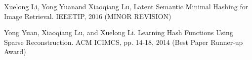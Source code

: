 

\begin{cventries}
\vspace{-0.8em}
  \cventry
    {} %
    {} %
    {} %
    {} %
    {
      \begin{cvitems} %
        \item {Xuelong Li, Yong Yuanand Xiaoqiang Lu, Latent Semantic Minimal Hashing for Image Retrieval. IEEETIP, 2016 (MINOR REVISION)}
        \item {Yong Yuan, Xiaoqiang Lu, and Xuelong Li. Learning Hash Functions Using Sparse Reconstruction. ACM ICIMCS, pp. 14-18, 2014 (Best Paper Runner-up Award)}
      \end{cvitems}
    }


\end{cventries}
